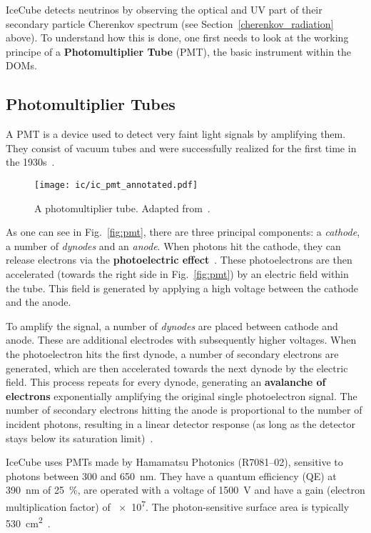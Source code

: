 IceCube detects neutrinos by observing the optical and UV part of their secondary particle Cherenkov spectrum (see Section~\ref{cherenkov_radiation} above). To understand how this is done, one first needs to look at the working principe of a \textbf{Photomultiplier Tube} (PMT), the basic instrument within the DOMs.

\subsection{Photomultiplier Tubes}
A PMT is a device used to detect very faint light signals by amplifying them. They consist of vacuum tubes and were successfully realized for the first time in the 1930s~.

\begin{figure}[h!]
    \texttt{[image: ic/ic\_pmt\_annotated.pdf]}
    \caption[PMT schematic]{A photomultiplier tube. Adapted from~\cite{Bednarski2014}.}
\end{figure}

As one can see in Fig.~\ref{fig:pmt}, there are three principal components: a \textit{cathode}, a number of \textit{dynodes} and an \textit{anode}. When photons hit the cathode, they can release electrons via the \textbf{photoelectric effect}~. These photoelectrons are then accelerated (towards the right side in Fig.~\ref{fig:pmt}) by an electric field within the tube. This field is generated by applying a high voltage between the cathode and the anode.

To amplify the signal, a number of \textit{dynodes} are placed between cathode and anode. These are additional electrodes with subsequently higher voltages. When the photoelectron hits the first dynode, a number of secondary electrons are generated, which are then accelerated towards the next dynode by the electric field. This process repeats for every dynode, generating an \textbf{avalanche of electrons} exponentially amplifying the original single photoelectron signal. The number of secondary electrons hitting the anode is proportional to the number of incident photons, resulting in a linear detector response (as long as the detector stays below its saturation limit)~.

IceCube uses PMTs made by Hamamatsu Photonics (R7081--02), sensitive to photons between 300 and \SI{650}{\nm}. They have a quantum efficiency (QE) at \SI{390}{\nm} of \SI{25}{\percent}, are operated with a voltage of \SI{1500}{\V} and have a gain (electron multiplication factor) of \num{e7}. The photon-sensitive surface area is typically \SI{530}{\cm\squared}~.

